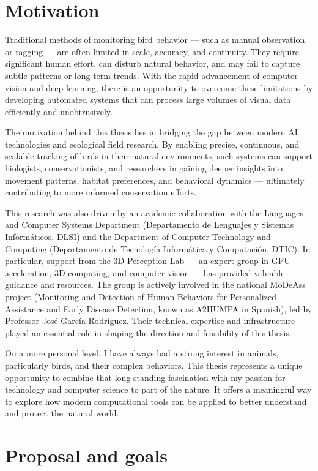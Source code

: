 \section{Motivation}

Traditional methods of monitoring bird behavior — such as manual observation or tagging — are often limited in scale, accuracy, and continuity. They require significant human effort, can disturb natural behavior, and may fail to capture subtle patterns or long-term trends. With the rapid advancement of computer vision and deep learning, there is an opportunity to overcome these limitations by developing automated systems that can process large volumes of visual data efficiently and unobtrusively.

The motivation behind this thesis lies in bridging the gap between modern AI technologies and ecological field research. By enabling precise, continuous, and scalable tracking of birds in their natural environments, such systems can support biologists, conservationists, and researchers in gaining deeper insights into movement patterns, habitat preferences, and behavioral dynamics — ultimately contributing to more informed conservation efforts.

This research was also driven by an academic collaboration with the Languages and Computer Systems Department (Departamento de Lenguajes y Sistemas Informáticos, DLSI) and the Department of Computer Technology and Computing (Departamento de Tecnología Informática y Computación, DTIC). In particular, support from the 3D Perception Lab — an expert group in GPU acceleration, 3D computing, and computer vision — has provided valuable guidance and resources. The group is actively involved in the national MoDeAss project (Monitoring and Detection of Human Behaviors for Personalized Assistance and Early Disease Detection, known as A2HUMPA in Spanish), led by Professor José García Rodríguez. Their technical expertise and infrastructure played an essential role in shaping the direction and feasibility of this thesis.

On a more personal level, I have always had a strong interest in animals, particularly birds, and their complex behaviors. This thesis represents a unique opportunity to combine that long-standing fascination with my passion for technology and computer science to part of the nature. It offers a meaningful way to explore how modern computational tools can be applied to better understand and protect the natural world.

\section{Proposal and goals}

